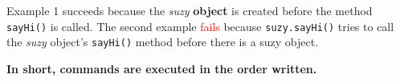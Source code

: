 \documentclass{article}
\begin{document}
\begin{flushleft}
Example 1 succeeds because the \emph{suzy} \textbf{object} is created before the method \texttt{sayHi()} is called. The second example \textcolor{red}{fails} because \texttt{suzy.sayHi()} tries to call the \emph{suzy} object's \texttt{sayHi()} method before there is a suzy object.\par
\begin{center}
\begin{tcolorbox}[enhanced,width=5in,center upper,size=fbox,
    fontupper=\large\bfseries,drop shadow southwest,sharp corners]
\textbf{In short, commands are executed in the order written.}
\end{tcolorbox}
\end{center}




\end{flushleft}


\begin{comment}
\begin{verbatim}
  int main() {
    printf('hello world'):
    return 0;
  }
\end{verbatim}
\end{comment}
\end{document}

